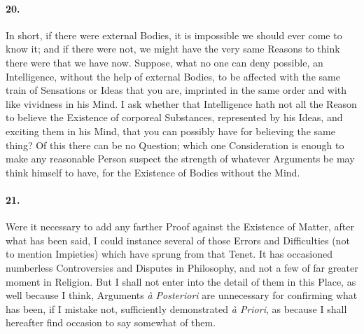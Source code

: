 \documentclass[]{article}
\newenvironment{sectionbody}{\begin{multicols}{2}}{\end{multicols}}
\begin{document}
\begin{sectionbody}
\paragraph{20.} In short, if there were external Bodies, it is impossible we
should ever come to know it; and if there were not, we might have
the very same Reasons to think there were that we have now.
Suppose, what no one can deny possible, an Intelligence, without
the help of external Bodies, to be affected with the same train
of Sensations or Ideas that you are, imprinted in the same order
and with like vividness in his Mind.  I ask whether that
Intelligence hath not all the Reason to believe the Existence of
corporeal Substances, represented by his Ideas, and exciting them
in his Mind, that you can possibly have for believing the same
thing? Of this there can be no Question; which one Consideration
is enough to make any reasonable Person suspect the strength of
whatever Arguments be may think himself to have, for the
Existence of Bodies without the Mind.



\paragraph{21.} Were it necessary to add any farther Proof against the Existence
of Matter, after what has been said, I could instance several of
those Errors and Difficulties (not to mention Impieties) which
have sprung from that Tenet.  It has occasioned numberless
Controversies and Disputes in Philosophy, and not a few of far
greater moment in Religion.  But I shall not enter into the
detail of them in this Place, as well because I think, Arguments
\emph{\`{a} Posteriori} are unnecessary for confirming what
has been, if I mistake not, sufficiently demonstrated
\emph{\`{a} Priori}, as because I shall hereafter find
occasion to say somewhat of them.




\end{sectionbody}
\end{document}
